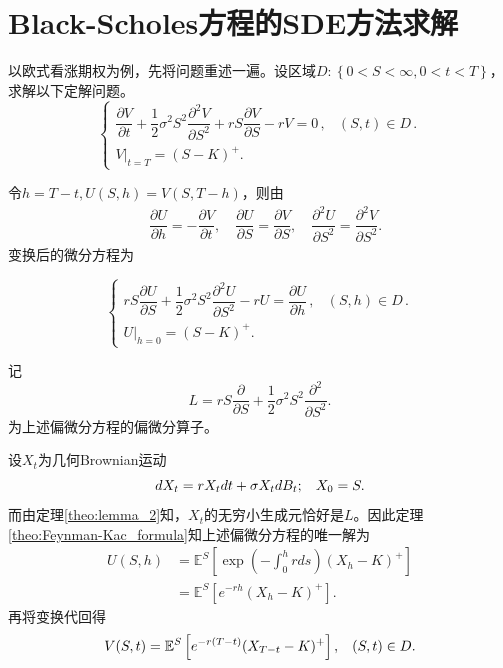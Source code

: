 \documentclass[oneside]{sysuthesis}
\begin{document}
\section{Black-Scholes方程的SDE方法求解}

以欧式看涨期权为例，先将问题重述一遍。设区域$D:\left\{0<S<\infty,0<t<T\right\}$，求解以下定解问题。
\[
\begin{cases}
	\dfrac{\partial V}{\partial t} + \dfrac{1}{2}\sigma^2 S^2 \dfrac{\partial^2 V}{\partial S^2} + rS \dfrac{\partial V}{\partial S} - rV = 0\,, & (S,t)\in D\,.\\[10pt]
	V|_{t=T} = (S - K)^+.
\end{cases}
\]

令$h=T-t,U(S,h)=V(S,T-h)$，则由
\begin{equation*}
	\begin{split}
		&\dfrac{\partial U}{\partial h}=-\dfrac{\partial V}{\partial t},\quad
		\dfrac{\partial U}{\partial S}=\dfrac{\partial V}{\partial S},\quad
		\dfrac{\partial^2 U}{\partial S^2}=\dfrac{\partial^2 V}{\partial S^2}.
	\end{split}
\end{equation*}
变换后的微分方程为

\[
\begin{cases}
	rS\dfrac{\partial U}{\partial S}+\dfrac{1}{2}\sigma^2 S^2\dfrac{\partial^2 U}{\partial S^2}-rU=\dfrac{\partial U}{\partial h}\,, & (S,h)\in D\,.\\[10pt]
	U|_{h=0} = (S - K)^+.
\end{cases}
\]

记
\begin{equation*}
	L=rS\dfrac{\partial}{\partial S}+\dfrac{1}{2}\sigma^2 S^2\dfrac{\partial^2}{\partial S^2}.
\end{equation*}
为上述偏微分方程的偏微分算子。

设$X_t$为几何Brownian运动
\begin{equation*}
	dX_t=rX_tdt+\sigma X_tdB_t;\hspace{0.3cm}X_0=S.
\end{equation*}
而由定理\ref{theo:lemma_2}知，$X_t$的无穷小生成元恰好是$L$。因此定理\ref{theo:Feynman-Kac_formula}知上述偏微分方程的唯一解为
\begin{equation}
	\begin{split}
		U(S,h)&=\mathbb{E}^S\left[\exp(-\int_{0}^{h}rds)(X_h-K)^+\right]\\
		&=\mathbb{E}^S\left[e^{-rh}(X_h-K)^+\right].
	\end{split}
\end{equation}
再将变换代回得
\begin{equation}
	V(S,t)=\mathbb{E}^S\left[e^{-r(T-t)}(X_{T-t}-K)^+\right],\hspace{0.3cm}(S,t)\in D.
\end{equation}
\end{document}
